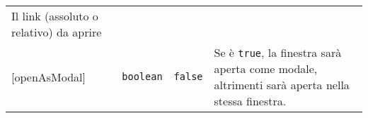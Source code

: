 \begin{tabularx}{\textwidth}{XXXX}
\begin{minipage}[t]{0.22\columnwidth}
Il link (assoluto o relativo) da aprire\strut
\end{minipage}\tabularnewline
\begin{minipage}[t]{0.22\columnwidth}\raggedright
{[}openAsModal{]}\strut
\end{minipage} & \begin{minipage}[t]{0.22\columnwidth}\raggedright
\texttt{boolean}\strut
\end{minipage} & \begin{minipage}[t]{0.22\columnwidth}\raggedright
\texttt{false}\strut
\end{minipage} & \begin{minipage}[t]{0.22\columnwidth}\raggedright
Se è \texttt{true}, la finestra sarà aperta come modale, altrimenti sarà
aperta nella stessa finestra.\strut
\end{minipage}\tabularnewline
\bottomrule
\end{tabularx}
